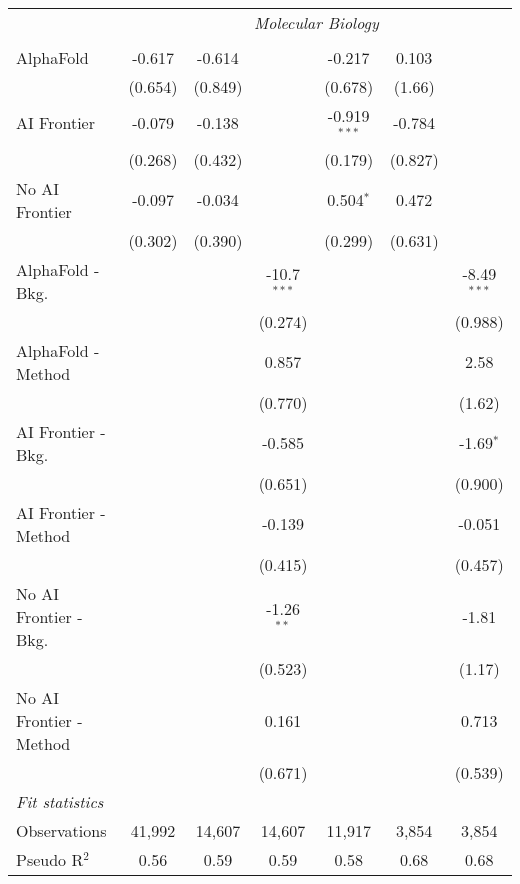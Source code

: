 \begin{tabular}{lcccccc}
 & \multicolumn{6}{c}{\textit{Molecular Biology}} \\ \\
   AlphaFold               & -0.617  & -0.614  &               & -0.217         & 0.103   &   \\   
                           & (0.654) & (0.849) &               & (0.678)        & (1.66)  &   \\   
   AI Frontier             & -0.079  & -0.138  &               & -0.919$^{***}$ & -0.784  &   \\   
                           & (0.268) & (0.432) &               & (0.179)        & (0.827) &   \\   
   No AI Frontier          & -0.097  & -0.034  &               & 0.504$^{*}$    & 0.472   &   \\   
                           & (0.302) & (0.390) &               & (0.299)        & (0.631) &   \\   
   AlphaFold - Bkg.        &         &         & -10.7$^{***}$ &                &         & -8.49$^{***}$\\   
                           &         &         & (0.274)       &                &         & (0.988)\\   
   AlphaFold - Method      &         &         & 0.857         &                &         & 2.58\\   
                           &         &         & (0.770)       &                &         & (1.62)\\   
   AI Frontier - Bkg.      &         &         & -0.585        &                &         & -1.69$^{*}$\\   
                           &         &         & (0.651)       &                &         & (0.900)\\   
   AI Frontier - Method    &         &         & -0.139        &                &         & -0.051\\   
                           &         &         & (0.415)       &                &         & (0.457)\\   
   No AI Frontier - Bkg.   &         &         & -1.26$^{**}$  &                &         & -1.81\\   
                           &         &         & (0.523)       &                &         & (1.17)\\   
   No AI Frontier - Method &         &         & 0.161         &                &         & 0.713\\   
                           &         &         & (0.671)       &                &         & (0.539)\\   
   \midrule
   \emph{Fit statistics}\\
   Observations            & 41,992  & 14,607  & 14,607        & 11,917         & 3,854   & 3,854\\  
   Pseudo R$^2$            & 0.56    & 0.59    & 0.59          & 0.58           & 0.68    & 0.68\\  
   

\end{tabular}
